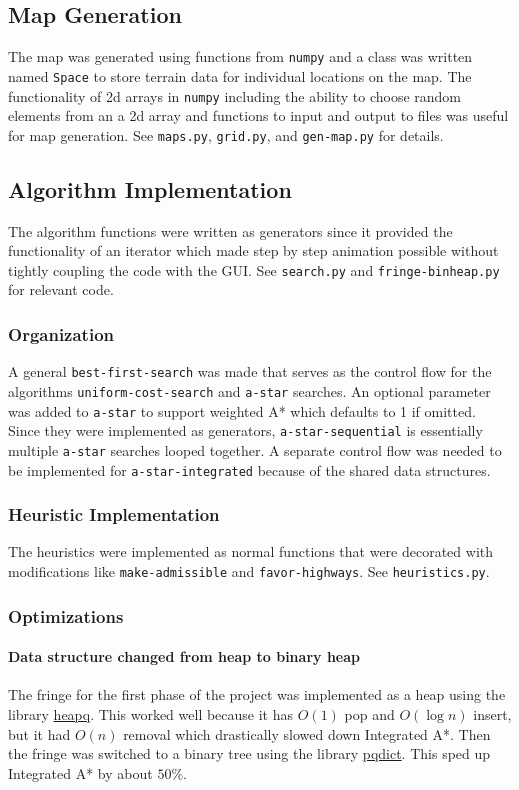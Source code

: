 \documentclass[11pt,letter]{article}
\begin{document}
\subsection{Map Generation}
The map was generated using functions from \verb_numpy_ and a class was written named \verb_Space_ to store terrain data for individual locations on the map. The functionality of 2d arrays in \verb_numpy_ including the ability to choose random elements from an a 2d array and functions to input and output to files was useful for map generation. See \verb_maps.py_, \verb_grid.py_, and \verb_gen-map.py_ for details.

\subsection{Algorithm Implementation}

The algorithm functions were written as generators since it provided the functionality of an iterator which made step by step animation possible without tightly coupling the code with the GUI. See \verb_search.py_ and \verb_fringe-binheap.py_ for relevant code.

\subsubsection{Organization}

A general \verb_best-first-search_ was made that serves as the control flow for the algorithms \verb_uniform-cost-search_ and \verb_a-star_ searches. An optional parameter was added to \verb_a-star_ to support weighted A* which defaults to 1 if omitted.
Since they were implemented as generators, \verb_a-star-sequential_ is essentially multiple \verb_a-star_ searches looped together. A separate control flow was needed to be implemented for \verb_a-star-integrated_ because of the shared data structures.

\subsubsection{Heuristic Implementation}
The heuristics were implemented as normal functions that were decorated with modifications like \verb_make-admissible_ and \verb_favor-highways_. See \verb_heuristics.py_.

\subsubsection{Optimizations}
\paragraph{Data structure changed from heap to binary heap}
The fringe for the first phase of the project was implemented as a heap using the library \href{https://docs.python.org/2/library/heapq.html}{heapq}. This worked well because it has $O(1)$ pop and $O(\log{n})$ insert, but it had $O(n)$ removal which drastically slowed down Integrated A*. Then the fringe was switched to a binary tree using the library \href{https://pypi.python.org/pypi/pqdict/}{pqdict}. This sped up Integrated A* by about $50\%$.
\end{document}
